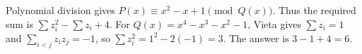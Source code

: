 Polynomial division gives $P(x)\equiv x^2-x+1\pmod{Q(x)}$. Thus the required sum is $\sum z_i^2-\sum z_i+4$. For $Q(x)=x^4-x^3-x^2-1$, Vieta gives $\sum z_i=1$ and $\sum_{i<j}z_iz_j=-1$, so $\sum z_i^2=1^2-2(-1)=3$. The answer is $\boxed{3-1+4=6}$.
